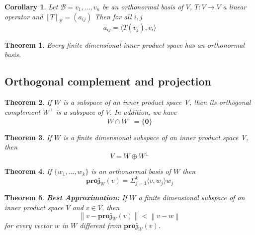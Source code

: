 \documentclass{article}
\newcommand{\norm}[1]{\left\lVert#1\right\rVert}
\newcommand{\innerproduct}[1]{\langle#1\rangle}
\newtheorem{theorem}{Theorem}[section]
\newtheorem{corollary}{Corollary}[theorem]
\numberwithin{theorem}{subsection} %
\begin{document}
\begin{corollary}

    Let $ \mathcal{B} = {v_1,...,v_n}$ be an orthonormal basis of $V$,
    $T:V\rightarrow V$ a linear operator and $[T]_\mathcal{B} = (a_{ij})$ Then for all $i,j$ \\
    \begin{equation*}
    a_{ij}=\innerproduct{T(v_j), v_i}
    \end{equation*}
\end{corollary}

\begin{theorem}
    Every finite dimensional inner product space has an orthonormal basis.
\end{theorem}



\subsection{Orthogonal complement and projection}
\begin{theorem}
    If $W$ is a subspace of an inner product space V, then its orthogonal complement
    $W^{\perp}$ is a subspace of $V$. In addition, we have
    \begin{equation*}
        W \cap W^{\perp} = \{\mathbf{0}\}
    \end{equation*}
\end{theorem}

\begin{theorem}
    If $W$ is a finite dimensional subspace of an inner product space V, then
    \begin{equation*}
        V = W \oplus W^{\perp} 
    \end{equation*}
\end{theorem}

\begin{theorem}
    If $\{w_1, ..., w_k\}$ is an orthonormal basis of $W$ then 
    \begin{equation*}
        \mathbf{proj}_W(v) = \Sigma^k_{j=1} \innerproduct{v,w_j}w_j
    \end{equation*}
\end{theorem}


\begin{theorem} 
    \textbf{Best Approximation:}
    If $W$ a finite dimensional subspace of an inner product space $V$ and $v \in V$, then
    \begin{equation*}
        \norm{v-\mathbf{proj}_W(v)} < \norm{v-w}
    \end{equation*}
    for every vector $w$ in $W$ different from $\mathbf{proj}_W(v)$.
\end{theorem}
\end{document}
